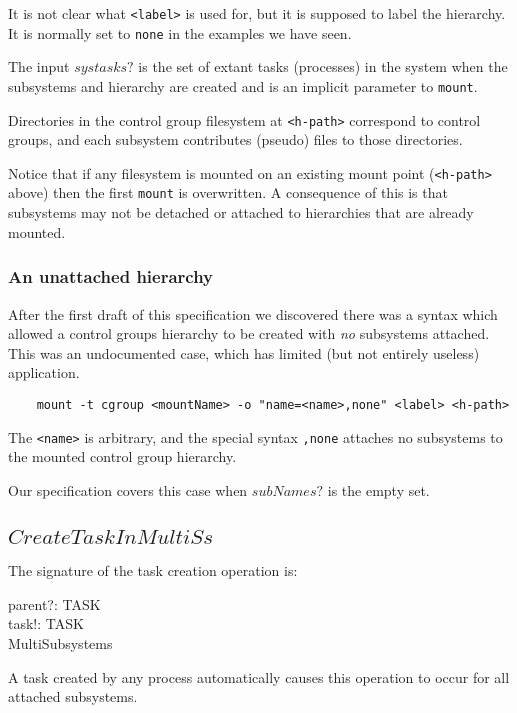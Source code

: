 \documentclass[a4paper,twoside,12pt]{article}
\begin{document}
It is not clear what \texttt{<label>} is used for, but it is supposed to label the hierarchy.
It is normally set to \texttt{none} in the examples we have seen.

The input $systasks?$ is the set of extant tasks (processes) in the system when the subsystems and hierarchy
are created and is an implicit parameter to \texttt{mount}.

Directories in the control group filesystem at \texttt{<h-path>} correspond to control groups, 
and each subsystem contributes
(pseudo) files to those directories.

Notice that if any filesystem is mounted on an existing mount point (\texttt{<h-path>} above) then the first 
\texttt{mount} is overwritten.
A consequence of this is that subsystems may not be detached or attached to hierarchies that are already mounted.

\subsubsection{An unattached hierarchy}

After the first draft of this specification we discovered there was a syntax which allowed a control groups hierarchy to be created with \emph{no} subsystems attached. This was an undocumented case, which has limited (but not entirely useless) application.

\begin{verbatim}
    mount -t cgroup <mountName> -o "name=<name>,none" <label> <h-path>
\end{verbatim}
The \texttt{<name>} is arbitrary, and the special syntax \texttt{,none} attaches no subsystems to the mounted
control group hierarchy.

Our specification covers this case when $subNames?$ is the empty set.

\subsection{$CreateTaskInMultiSs$}

The signature of the task creation operation is:
\begin{schema*}
    parent?: TASK \\
    task!: TASK \\
\also
    \Delta MultiSubsystems
\end{schema*}
A task created by any process automatically causes this operation to occur for all attached subsystems.
\end{document}
